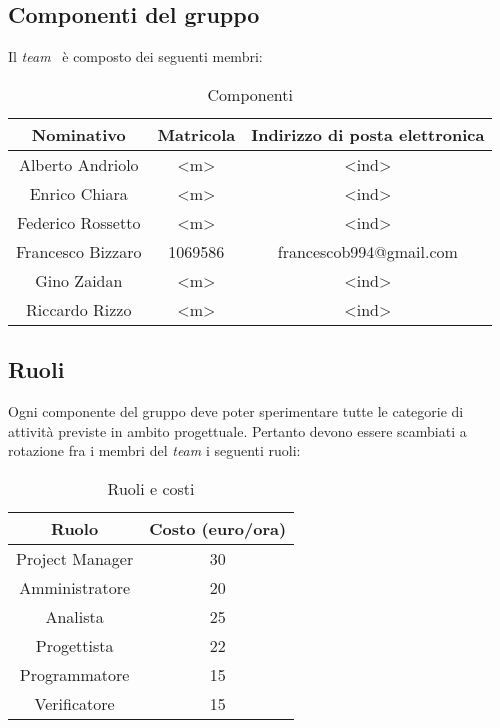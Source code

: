 \newpage

\subsection{Componenti del gruppo}
Il \textit{team} \GRUPPO\ è composto dei seguenti membri:
\begin{table}[h]
\centering
\bgroup
\def\arraystretch{1.6}
\begin{tabular}{| c | c | c |}
\hline
\textbf{Nominativo} & \textbf{Matricola} & \textbf{Indirizzo di posta elettronica} \\ \hline \hline 
Alberto Andriolo & <m> & <ind> \\ \hline
Enrico Chiara & <m> & <ind> \\ \hline
Federico Rossetto & <m> & <ind> \\ \hline
Francesco Bizzaro & 1069586 & francescob994@gmail.com  \\ \hline  
Gino Zaidan & <m> & <ind>  \\ \hline 
Riccardo Rizzo & <m> & <ind>  \\ \hline
\end{tabular}
\egroup
\caption{Componenti}
\end{table}

\subsection{Ruoli}
Ogni componente del gruppo deve poter sperimentare tutte le categorie di attività previste in ambito progettuale. Pertanto devono essere scambiati a rotazione fra i membri del \textit{team} i seguenti ruoli:
\begin{table}[h]
\centering
\bgroup
\def\arraystretch{1.6}
\begin{tabular}{| c | c |}
\hline
\textbf{Ruolo} & \textbf{Costo (euro/ora)}\\ \hline \hline
Project Manager & 30  \\ \hline 
Amministratore & 20  \\ \hline 
Analista & 25  \\ \hline 
Progettista & 22  \\ \hline 
Programmatore & 15  \\ \hline
Verificatore & 15  \\ \hline  
\end{tabular}
\egroup
\caption{Ruoli e costi}
\end{table}

\newpage